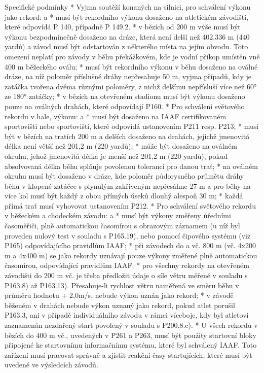 Specifické podmínky
* Vyjma soutěží konaných na silnici, pro schválení výkonu jako rekord:
  \begitems \style a
  * musí být rekordního výkonu dosaženo na atletickém závodišti, které odpovídá P 140, případně P 149.2.
  * v bězích od 200 m výše musí být výkonu bezpodmínečně dosaženo na dráze, která není delší než 402,336 m (440 yardů) a závod musí být odstartován z některého místa na jejím obvodu. Toto omezení neplatí pro závody v běhu překážkovém, kde je vodní příkop umístěn vně 400 m běžeckého oválu;
  * musí být rekordního výkonu v běhu dosaženo na oválné dráze, na níž poloměr příslušné dráhy nepřesahuje 50 m, vyjma případů, kdy je zatáčka tvořena dvěma různými poloměry, z nichž delšímu nepřísluší více než 60° ze 180° zatáčky;
  * v bězích na otevřeném stadionu musí být výkonu dosaženo pouze na oválných drahách, které odpovídají P160.
  \enditems
* Pro schválení světového rekordu v hale, výkonu:
  \begitems \style a
  * musí být dosaženo na IAAF certifikovaném sportovišti nebo sportovišti, které odpovídá ustanovením P211 resp. P213;
  * musí být v bězích na tratích 200 m a delších dosaženo na drahách, jejichž jmenovitá délka není větší než 201,2 m (220 yardů);
  * může být dosaženo na oválném okruhu, jehož jmenovitá délka je menší než 201,2 m (220 yardů), pokud absolvovaná délka běhu splňuje povolenou toleranci pro danou trať;
  * na oválném okruhu musí být dosaženo v dráze, kde poloměr půdorysného průmětu dráhy běhu v klopené zatáčce s plynulým zakřiveným nepřesáhne 27 m a pro běhy na více kol musí být každý z obou přímých úseků dlouhý alespoň 30 m;
  * každá přímá trať musí vyhovovat ustanovením P212.
  \enditems
* Pro schválení světového rekordu v běžeckém a chodeckém závodu:
  \begitems \style a
  * musí být výkony změřeny úředními časoměřiči, plně automatickou časomírou s obrazovým záznamem (u níž byl proveden nulový test v souladu s P165.19), nebo pomocí čipového systému (viz P165) odpovídajícího pravidlům IAAF;
  * při závodech do a vč. 800 m (vč. 4x200 m a 4x400 m) se jako rekordy uznávají pouze výkony změřené plně automatickou časomírou, odpovídající pravidlům IAAF;
  * pro všechny rekordy na otevřeném závodišti do 200 m vč. je třeba předložit údaje o síle větru měřené v souladu s P163.8) až P163.13). Přesahuje-li rychlost větru naměřená ve směru běhu v průměru hodnotu + 2,0m/s, nebude výkon uznán jako rekord;
  * v závodě běženém v drahách nebude výkon uznaný jako rekord, pokud atlet porušil P163.3, ani v případě individuálního závodu v rámci víceboje, kdy byl atletovi zaznamenán nezdařený start povolený v souladu s P200.8.c).
  * U všech rekordů v bězích do 400 m vč., uvedených v P261 a P263, musí být použity startovní bloky připojené ke startovnímu informačnímu systému, které byl schválený IAAF. Toto zařízení musí pracovat správně a zjistit reakční časy startujících, které musí být uvedené ve výsledcích závodů.
